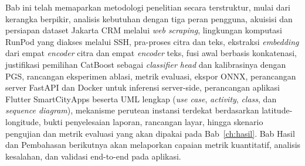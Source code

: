 Bab ini telah memaparkan metodologi penelitian secara terstruktur, mulai dari kerangka berpikir, analisis kebutuhan dengan tiga peran pengguna, akuisisi dan persiapan dataset Jakarta CRM melalui \textit{web scraping}, lingkungan komputasi RunPod yang diakses melalui SSH, pra-proses citra dan teks, ekstraksi \textit{embedding} dari empat \textit{encoder} citra dan empat \textit{encoder} teks, fusi awal berbasis konkatenasi, justifikasi pemilihan CatBoost sebagai \textit{classifier head} dan kalibrasinya dengan PGS, rancangan eksperimen ablasi, metrik evaluasi, ekspor ONNX, perancangan server FastAPI dan Docker untuk inferensi server-side, perancangan aplikasi Flutter SmartCityApps beserta UML lengkap (\textit{use case}, \textit{activity}, \textit{class}, dan \textit{sequence diagram}), mekanisme perutean instansi terdekat berdasarkan latitude-longitude, bukti penyelesaian laporan, rancangan layar, hingga skenario pengujian dan metrik evaluasi yang akan dipakai pada Bab~\ref{ch:hasil}. Bab Hasil dan Pembahasan berikutnya akan melaporkan capaian metrik kuantitatif, analisis kesalahan, dan validasi end-to-end pada aplikasi.
